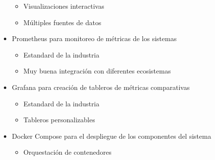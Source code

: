 \begin{itemize}
\begin{itemize}
           \item Visualizaciones interactivas
           \item Múltiples fuentes de datos
       \end{itemize}
    \item Prometheus para monitoreo de métricas de los sistemas
       \begin{itemize}
           \item Estandard de la industria
           \item Muy buena integración con diferentes ecosistemas
       \end{itemize}
    \item Grafana para creación de tableros de métricas comparativas
       \begin{itemize}
            \item Estandard de la industria
            \item Tableros personalizables
       \end{itemize}
    \item Docker Compose para el despliegue de los componentes del sistema
       \begin{itemize}
           \item Orquestación de contenedores
       \end{itemize}
   \end{itemize}
\newpage
